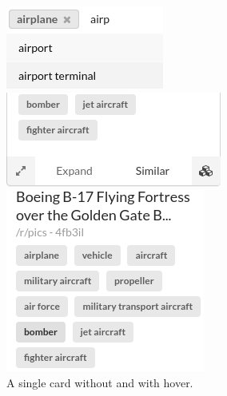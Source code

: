 \documentclass[msc,oneside]{ubcthesis}%
\begin{document}
\begin{figure}[H]
\begin{multicols}{3}
    \includegraphics[width=\linewidth]{dropdown_search.png}\par
    \includegraphics[width=\linewidth]{similar.png}\par
    \includegraphics[width=\linewidth]{labelclick.png}\par
\end{multicols}
\caption{A single card without and with hover.}
\end{figure}

\end{document}
